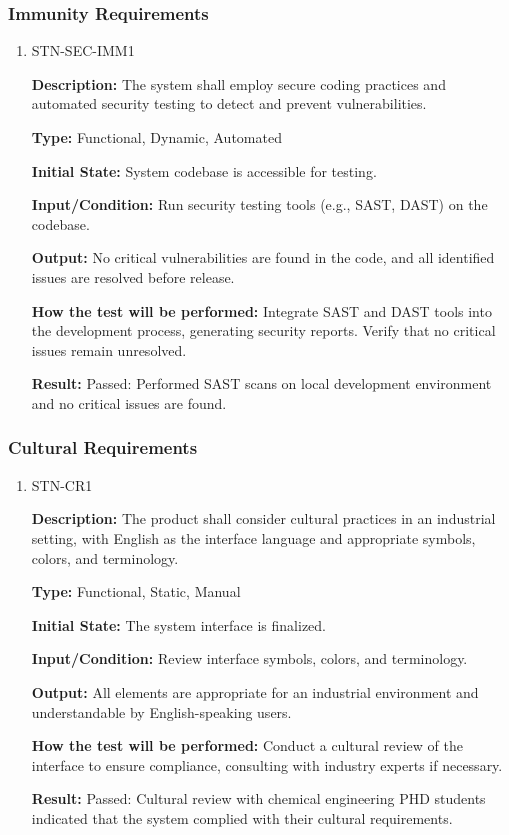\documentclass[12pt, titlepage]{article}
\begin{document}
\subsubsection{Immunity Requirements}

\begin{enumerate}

\item{STN-SEC-IMM1\\}

\textbf{Description:} The system shall employ secure coding practices and automated security testing to detect and prevent vulnerabilities.

\textbf{Type:} Functional, Dynamic, Automated

\textbf{Initial State:} System codebase is accessible for testing.

\textbf{Input/Condition:} Run security testing tools (e.g., SAST, DAST) on the codebase.

\textbf{Output:} No critical vulnerabilities are found in the code, and all identified issues are resolved before release.

\textbf{How the test will be performed:} Integrate SAST and DAST tools into the development process, generating security reports. Verify that no critical issues remain unresolved.

\textbf{Result:} Passed: Performed SAST scans on local development environment and no critical issues are found.

\end{enumerate}

\subsubsection{Cultural Requirements}

\begin{enumerate}

\item{STN-CR1\\}

\textbf{Description:} The product shall consider cultural practices in an industrial setting, with English as the interface language and appropriate symbols, colors, and terminology.

\textbf{Type:} Functional, Static, Manual

\textbf{Initial State:} The system interface is finalized.

\textbf{Input/Condition:} Review interface symbols, colors, and terminology.

\textbf{Output:} All elements are appropriate for an industrial environment and understandable by English-speaking users.

\textbf{How the test will be performed:} Conduct a cultural review of the interface to ensure compliance, consulting with industry experts if necessary.

\textbf{Result:} Passed: Cultural review with chemical engineering PHD students indicated that the system complied with their cultural requirements.

\end{enumerate}
\end{document}
